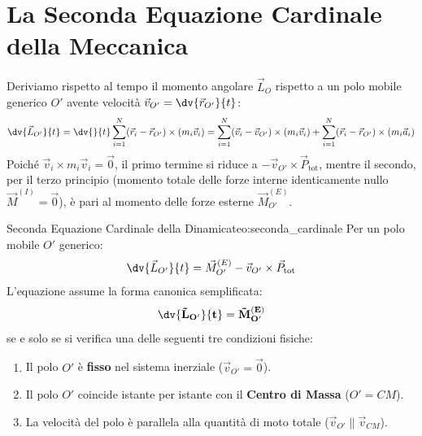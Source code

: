 \section{La Seconda Equazione Cardinale della Meccanica}
\label{sec:seconda_cardinale}

Deriviamo rispetto al tempo il momento angolare $\vec{L}_O$ rispetto a un polo mobile generico $O'$ avente velocità $\vec{v}_{O'} = \dv{\vec{r}_{O'}}{t}$:
\begin{equation}
    \dv{\vec{L}_{O'}}{t} = \dv{}{t}\sum_{i=1}^N (\vec{r}_i - \vec{r}_{O'}) \times (m_i\vec{v}_i) = \sum_{i=1}^N (\vec{v}_i - \vec{v}_{O'}) \times (m_i\vec{v}_i) + \sum_{i=1}^N (\vec{r}_i - \vec{r}_{O'}) \times (m_i\vec{a}_i)
\end{equation}
Poiché $\vec{v}_i \times m_i\vec{v}_i = \vec{0}$, il primo termine si riduce a $-\vec{v}_{O'} \times \vec{P}_{\text{tot}}$, mentre il secondo, per il terzo principio (momento totale delle forze interne identicamente nullo $\vec{M}^{(I)} = \vec{0}$), è pari al momento delle forze esterne $\vec{M}_{O'}^{(E)}$.

\begin{teorema}{Seconda Equazione Cardinale della Dinamica}{teo:seconda_cardinale}
Per un polo mobile $O'$ generico:
\begin{equation}
    \dv{\vec{L}_{O'}}{t} = \vec{M}_{O'}^{(E)} - \vec{v}_{O'} \times \vec{P}_{\text{tot}}
    \label{eq:seconda_cardinale_gen}
\end{equation}
L'equazione assume la forma canonica semplificata:
\begin{equation}
    \mathbf{\dv{\vec{L}_{O'}}{t} = \vec{M}_{O'}^{(E)}}
    \label{eq:seconda_cardinale_canonica}
\end{equation}
se e solo se si verifica una delle seguenti tre condizioni fisiche:
\begin{enumerate}
    \item Il polo $O'$ è \textbf{fisso} nel sistema inerziale ($\vec{v}_{O'} = \vec{0}$).
    \item Il polo $O'$ coincide istante per istante con il \textbf{Centro di Massa} ($O' = CM$).
    \item La velocità del polo è parallela alla quantità di moto totale ($\vec{v}_{O'} \parallel \vec{v}_{CM}$).
\end{enumerate}
\end{teorema}

